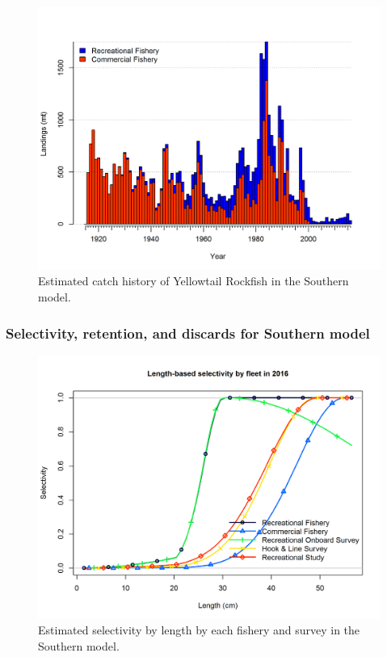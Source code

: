 \documentclass[12pt,]{article}
\begin{document}
\newpage

\begin{figure}[htbp]
\centering
\includegraphics{r4ss/plots_mod2/catch2 landings stacked.png}
\caption{Estimated catch history of Yellowtail Rockfish in the Southern
model. \label{fig:r4ss_catch2_S}}
\end{figure}

\FloatBarrier

\newpage 

\subsubsection{Selectivity, retention, and discards for Southern
model}\label{selectivity-retention-and-discards-for-southern-model}

\begin{figure}[htbp]
\centering
\includegraphics{r4ss/plots_mod2/sel01_multiple_fleets_length1.png}
\caption{Estimated selectivity by length by each fishery and survey in
the Southern model. \label{fig:selex.S}}
\end{figure}
\end{document}
